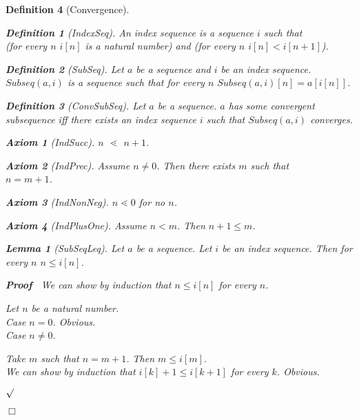 \documentclass{article}
\newenvironment{forthel}{\begin{leftbar}}{\end{leftbar}}
\newenvironment{proof}{\noindent\textbf{Proof\ }}{\hspace*{\fill}$\Box$\medskip}
\newenvironment{subproof}{\begin{list}{}{}
		\item[\text{Proof}]}{\hfill $\surd$ \end{list}}
\newenvironment{case}{\begin{list}{}{}
		\item[]}{\end{list}}
\newtheorem{axiom}{Axiom}
\newtheorem{lemma}{Lemma}
\newtheorem{definition}{Definition}
\begin{document}
\begin{forthel}
\begin{definition}[Convergence]
	
	\begin{definition}[IndexSeq]
		An index sequence is a sequence $i$ such that \\
		(for every $n$ $i[n]$ is a natural number) and (for every $n$ $i[n] < i[n + 1]$).
	\end{definition}
	
	\begin{definition}[SubSeq]
		Let $a$ be a sequence and $i$ be an index sequence. $Subseq(a,i)$ is a sequence such that for every $n$
		$Subseq(a,i)[n] = a[i[n]]$.
	\end{definition}
	
	\begin{definition}[ConvSubSeq]
		Let $a$ be a sequence. $a$ has some convergent subsequence iff there exists an index sequence $i$ such that $Subseq(a,i)$ converges.
	\end{definition}
	
	\begin{axiom}[IndSucc]
		$n$ $\lessdot$ $n + 1$. 
	\end{axiom}
	
	\begin{axiom}[IndPrec]
		Assume $n \neq 0$. Then there exists $m$ such that \\ $n = m + 1$.
	\end{axiom}
	
	\begin{axiom}[IndNonNeg]
		$n \lessdot 0$ for no $n$.
	\end{axiom}
	
	\begin{axiom}[IndPlusOne]
		Assume $n < m$. Then $n + 1 \leq m$.
	\end{axiom}
	
	\begin{lemma}[SubSeqLeq]
		Let $a$ be a sequence. Let $i$ be an index sequence. Then for every $n$ $n \leq i[n]$.
	\end{lemma}
	
	\begin{proof}
		We can show by induction that $n \leq i[n]$ for every $n$.
		\begin{subproof}
			Let $n$ be a natural number.\\
			Case $n = 0$. Obvious.\\
			Case $n \neq 0$.\\ 
			\begin{case}
				Take $m$ such that $n = m + 1$. Then $m \leq i[m]$.\\
				We can show by induction that $i[k] + 1 \leq i[k + 1]$ for every $k$. Obvious.\\
			\end{case}
		\end{subproof}
	\end{proof}
	

\end{definition}
\end{forthel}
\end{document}
